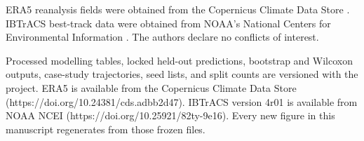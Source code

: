 \documentclass{ametsocv6.1}
\begin{document}

\acknowledgments
ERA5 reanalysis fields were obtained from the Copernicus Climate Data Store
\citep{hersbach2023era5}. IBTrACS best-track data were obtained from NOAA's
National Centers for Environmental Information \citep{knapp2010ibtracs,gahtan2024ibtracs}.
The authors declare no conflicts of interest.

\datastatement
Processed modelling tables, locked held-out predictions, bootstrap and Wilcoxon
outputs, case-study trajectories, seed lists, and split counts are versioned with
the project. ERA5 is available from the Copernicus Climate Data Store
(https://doi.org/10.24381/cds.adbb2d47). IBTrACS version 4r01 is available from
NOAA NCEI (https://doi.org/10.25921/82ty-9e16). Every new figure in this
manuscript regenerates from those frozen files.
\end{document}
